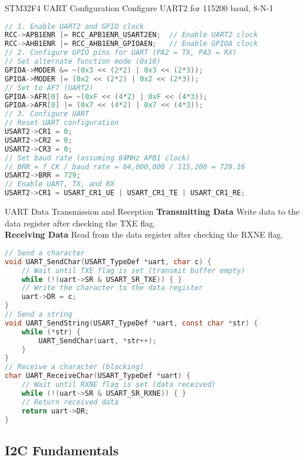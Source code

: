 \begin{code}{STM32F4 UART Configuration} Configure UART2 for 115200 baud, 8-N-1
\begin{lstlisting}[language=C, style=basesmol]
// 1. Enable UART2 and GPIO clock
RCC->APB1ENR |= RCC_APB1ENR_USART2EN;  // Enable UART2 clock
RCC->AHB1ENR |= RCC_AHB1ENR_GPIOAEN;   // Enable GPIOA clock
// 2. Configure GPIO pins for UART (PA2 = TX, PA3 = RX)
// Set alternate function mode (0x10)
GPIOA->MODER &= ~(0x3 << (2*2) | 0x3 << (2*3));
GPIOA->MODER |= (0x2 << (2*2) | 0x2 << (2*3));
// Set to AF7 (UART2)
GPIOA->AFR[0] &= ~(0xF << (4*2) | 0xF << (4*3));
GPIOA->AFR[0] |= (0x7 << (4*2) | 0x7 << (4*3));
// 3. Configure UART
// Reset UART configuration
USART2->CR1 = 0;
USART2->CR2 = 0;
USART2->CR3 = 0;
// Set baud rate (assuming 84MHz APB1 clock)
// BRR = f_CK / baud rate = 84,000,000 / 115,200 = 729.16
USART2->BRR = 729;
// Enable UART, TX, and RX
USART2->CR1 = USART_CR1_UE | USART_CR1_TE | USART_CR1_RE;
\end{lstlisting}
\end{code}

\begin{KR}{UART Data Transmission and Reception}
\textbf{Transmitting Data}
Write data to the data register after checking the TXE flag.\\
\textbf{Receiving Data}
Read from the data register after checking the RXNE flag.

\begin{lstlisting}[language=C, style=basesmol]
// Send a character
void UART_SendChar(USART_TypeDef *uart, char c) {
    // Wait until TXE flag is set (transmit buffer empty)
    while (!(uart->SR & USART_SR_TXE)) { }
    // Write the character to the data register
    uart->DR = c;
}
// Send a string
void UART_SendString(USART_TypeDef *uart, const char *str) {
    while (*str) {
        UART_SendChar(uart, *str++);
    }
}
// Receive a character (blocking)
char UART_ReceiveChar(USART_TypeDef *uart) {
    // Wait until RXNE flag is set (data received)
    while (!(uart->SR & USART_SR_RXNE)) { }
    // Return received data
    return uart->DR;
}
\end{lstlisting}
\end{KR}


\subsection{I2C Fundamentals}

